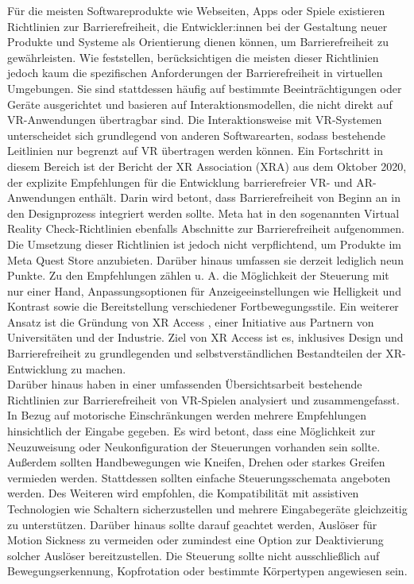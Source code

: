 Für die meisten Softwareprodukte wie Webseiten, Apps oder Spiele existieren Richtlinien zur Barrierefreiheit, die Entwickler:innen bei der Gestaltung neuer Produkte und Systeme als Orientierung dienen können, um Barrierefreiheit zu gewährleisten. Wie \citet{heilemann_accessibility_2021} feststellen, berücksichtigen die meisten dieser Richtlinien jedoch kaum die spezifischen Anforderungen der Barrierefreiheit in virtuellen Umgebungen. Sie sind stattdessen häufig auf bestimmte Beeinträchtigungen oder Geräte ausgerichtet und basieren auf Interaktionsmodellen, die nicht direkt auf VR-Anwendungen übertragbar sind. Die Interaktionsweise mit VR-Systemen unterscheidet sich grundlegend von anderen Softwarearten, sodass bestehende Leitlinien nur begrenzt auf VR übertragen werden können. Ein Fortschritt in diesem Bereich ist der Bericht der XR Association (XRA) aus dem Oktober 2020, der explizite Empfehlungen für die Entwicklung barrierefreier VR- und AR-Anwendungen enthält. Darin wird betont, dass Barrierefreiheit von Beginn an in den Designprozess integriert werden sollte. Meta hat in den sogenannten Virtual Reality Check-Richtlinien \citep{meta-vrc} ebenfalls Abschnitte zur Barrierefreiheit aufgenommen. Die Umsetzung dieser Richtlinien ist jedoch nicht verpflichtend, um Produkte im Meta Quest Store anzubieten. Darüber hinaus umfassen sie derzeit lediglich neun Punkte. Zu den Empfehlungen zählen u. A. die Möglichkeit der Steuerung mit nur einer Hand, Anpassungsoptionen für Anzeigeeinstellungen wie Helligkeit und Kontrast sowie die Bereitstellung verschiedener Fortbewegungsstile. Ein weiterer Ansatz ist die Gründung von XR Access \citep{xr_access}, einer Initiative aus Partnern von Universitäten und der Industrie. Ziel von XR Access ist es, inklusives Design und Barrierefreiheit zu grundlegenden und selbstverständlichen Bestandteilen der XR-Entwicklung zu machen. \\
Darüber hinaus haben \citet{heilemann_accessibility_2021} in einer umfassenden Übersichtsarbeit bestehende Richtlinien zur Barrierefreiheit von VR-Spielen analysiert und zusammengefasst. In Bezug auf motorische Einschränkungen werden mehrere Empfehlungen hinsichtlich der Eingabe gegeben. Es wird betont, dass eine Möglichkeit zur Neuzuweisung oder Neukonfiguration der Steuerungen vorhanden sein sollte. Außerdem sollten Handbewegungen wie Kneifen, Drehen oder starkes Greifen vermieden werden. Stattdessen sollten einfache Steuerungsschemata angeboten werden. Des Weiteren wird empfohlen, die Kompatibilität mit assistiven Technologien wie Schaltern sicherzustellen und mehrere Eingabegeräte gleichzeitig zu unterstützen. Darüber hinaus sollte darauf geachtet werden, Auslöser für Motion Sickness zu vermeiden oder zumindest eine Option zur Deaktivierung solcher Auslöser bereitzustellen. Die Steuerung sollte nicht ausschließlich auf Bewegungserkennung, Kopfrotation oder bestimmte Körpertypen angewiesen sein.

